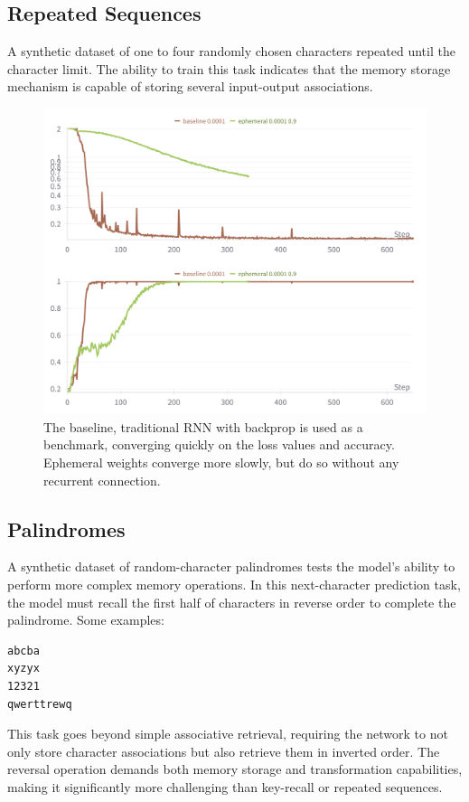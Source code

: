 \documentclass{article} %
\begin{document}
\subsection{Repeated Sequences}
A synthetic dataset of one to four randomly chosen characters repeated until the character limit. The ability to train this task indicates that the memory storage mechanism is capable of storing several input-output associations. 

\begin{figure}[h]
\begin{center}
\includegraphics[width=0.8\linewidth]{figure_2.png}
\caption{The baseline, traditional RNN with backprop is used as a benchmark, converging quickly on the loss values and accuracy. Ephemeral weights converge more slowly, but do so without any recurrent connection.}
\label{fig:repeated_sequences}
\end{center}
\end{figure}

\subsection{Palindromes}
A synthetic dataset of random-character palindromes tests the model's ability to perform more complex memory operations. In this next-character prediction task, the model must recall the first half of characters in reverse order to complete the palindrome. Some examples:
\begin{verbatim}
abcba
xyzyx
12321
qwerttrewq
\end{verbatim}

This task goes beyond simple associative retrieval, requiring the network to not only store character associations but also retrieve them in inverted order. The reversal operation demands both memory storage and transformation capabilities, making it significantly more challenging than key-recall or repeated sequences.
\end{document}

